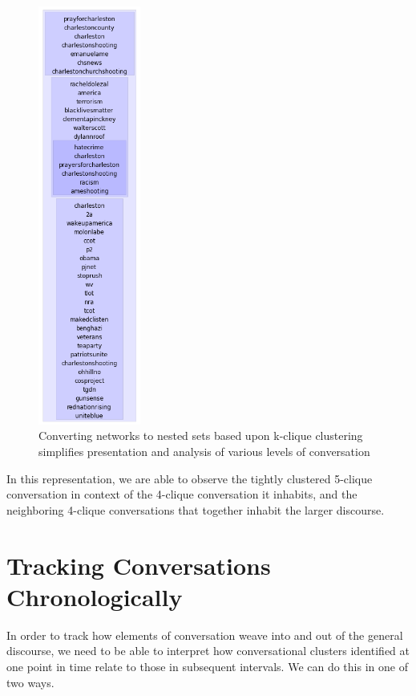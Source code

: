 \documentclass[12pt]{article}
\begin{document}
\begin{figure}[!ht]
  \centering
    \includegraphics[width=0.3\textwidth]{F5_one_column_nested_cluster.png}
    \caption{Converting networks to nested sets based  upon k-clique clustering simplifies presentation and  analysis of various levels of conversation}
  \label{fig:set_cluster}
\end{figure}
 
In this representation, we are able to observe the tightly clustered 5-clique conversation in context of the 4-clique conversation it inhabits, and the neighboring 4-clique conversations that together inhabit the larger discourse.

\section{Tracking Conversations Chronologically}
In order to track how elements of conversation weave into and out of the general discourse, we need to be able to interpret how conversational clusters identified at one point in time relate to those in subsequent intervals. We can do this in one of two ways. 
\end{document}
